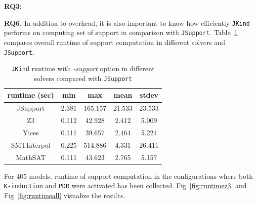 \noindent{}
 \vspace{9pt}

\textbf{RQ3:} 

\textbf{RQ6.} In addition to overhead, it is also important to know how efficiently \texttt{JKind} performs on computing set of support in comparison with \texttt{JSupport}. Table~\ref{tab:eff-comp-jsup} compares overall runtime of support computation in different solvers and \texttt{JSupport}.

\begin{table}
  \centering
  \begin{tabular}{ |c||c|c|c|c| }
    \hline
     runtime (sec) & min & max & mean & stdev \\[0.5ex]
    \hline\hline
    JSupport & 2.381 & 165.157 & 21.533 & 23.533 \\[0.5ex]
    Z3   & 0.112 & 42.928 & 2.412 & 5.009 \\[0.5ex]
    Yices &   0.111  & 39.657   & 2.464 & 5.224 \\[0.5ex]
    SMTInterpol& 0.225 & 514.886 &  4.331 & 26.411 \\[0.5ex]
    MathSAT & 0.111 & 43.623 &  2.765 & 5.157 \\[0.5ex]
    \hline
  \end{tabular}
  \caption{\small{\texttt{JKind} runtime with \emph{-support} option in different solvers compared with \texttt{JSupport}}}
  \label{tab:eff-comp-jsup}
\end{table}

For 405 models, runtime of support computation in the configurations where both \texttt{K-induction} and \texttt{PDR} were activated has been collected. Fig~\ref{fig:runtimez3} and Fig~\ref{fig:runtimeall} visualize the results.

